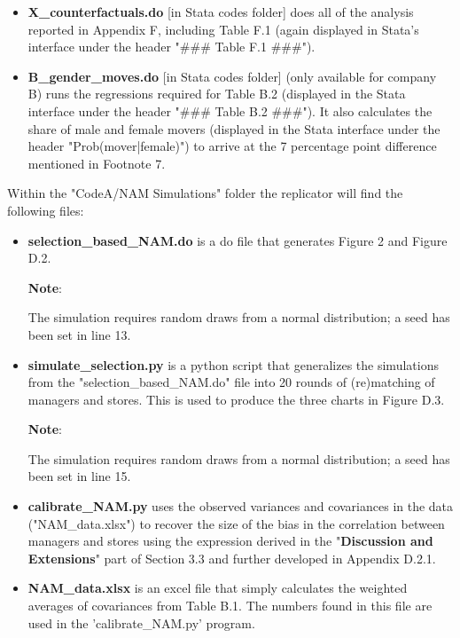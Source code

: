 \documentclass[
]{article}
\begin{document}
\begin{itemize}
    \item \textbf{X\_counterfactuals.do} [in Stata codes folder] does all of the analysis reported in {\color{blue}Appendix F}, including {\color{blue}Table F.1} (again displayed in Stata's interface under the header "\#\#\# Table F.1 \#\#\#").

    \item \textbf{B\_gender\_moves.do} [in Stata codes folder] (only available for company B) runs the regressions required for {\color{blue}Table B.2} (displayed in the Stata interface under the header "\#\#\# Table B.2 \#\#\#"). It also calculates the share of male and female movers (displayed in the Stata interface under the header "Prob(mover|female)") to arrive at the 7 percentage point difference mentioned in {\color{blue}Footnote 7}. 
\end{itemize}

Within the "CodeA/NAM Simulations" folder the replicator will find the following files:
\begin{itemize}
    \item \textbf{selection\_based\_NAM.do} is a do file that generates {\color{blue}Figure 2} and {\color{blue}Figure D.2}.

    \textbf{Note}:

    The simulation requires random draws from a normal distribution; a seed has been set in line 13.

    \item \textbf{simulate\_selection.py} is a python script that generalizes the simulations from the "selection\_based\_NAM.do" file into 20 rounds of (re)matching of managers and stores. This is used to produce the three charts in {\color{blue}Figure D.3}.

    \textbf{Note}:

    The simulation requires random draws from a normal distribution; a seed has been set in line 15.
    
    \item \textbf{calibrate\_NAM.py} uses the observed variances and covariances in the data ("NAM\_data.xlsx") to recover the size of the bias in the correlation between managers and stores using the expression derived in the "\textbf{Discussion and Extensions}" part of {\color{blue}Section 3.3} and further developed in {\color{blue}Appendix D.2.1}.
    
    \item \textbf{NAM\_data.xlsx} is an excel file that simply calculates the weighted averages of covariances from {\color{blue}Table B.1}. The numbers found in this file are used in the 'calibrate\_NAM.py' program.
\end{itemize}
\end{document}
